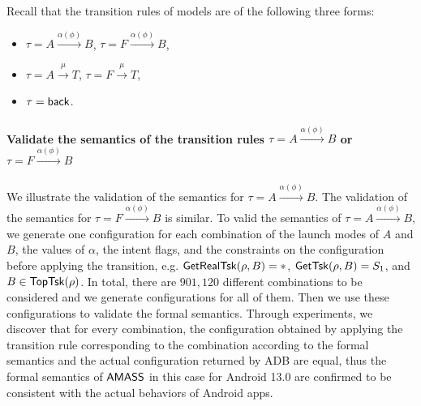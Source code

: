 Recall that the transition rules of {\AMASS} models are of the following three forms:
\begin{itemize}
	\item $\tau = A\xrightarrow{\alpha(\phi)}B$, $\tau = F\xrightarrow{\alpha(\phi)}B$,
	\item $\tau = A\xrightarrow{\mu}T$, $\tau = F\xrightarrow{\mu}T$,
	\item $\tau = {\mathsf{back} }$. 
\end{itemize}

\paragraph{Validate the semantics of the transition rules $\tau = A\xrightarrow{\alpha(\phi)}B$ or $\tau = F\xrightarrow{\alpha(\phi)}B$}
We illustrate the validation of the semantics for $\tau = A\xrightarrow{\alpha(\phi)}B$. The validation of the semantics for $\tau = F\xrightarrow{\alpha(\phi)}B$ is similar. To valid the semantics of $\tau = A\xrightarrow{\alpha(\phi)}B$, we generate one configuration for each combination of the launch modes of $A$ and $B$, the values of $\alpha$, the intent flags, and the constraints on the configuration before applying the transition, e.g. $\mathsf{GetRealTsk}(\rho, B) = *$, $\mathsf{GetTsk}(\rho, B) = S_1$, and $B\in\mathsf{TopTsk}(\rho)$. 
In total, there are  $901,120$  different combinations  %
to be considered and we generate configurations for all of them.
Then we use these configurations to validate the formal semantics. Through experiments, we discover that for every combination, the configuration obtained by applying the transition rule corresponding to the combination according to the formal semantics and the actual configuration returned by ADB are equal, thus the formal semantics of $\textsf{AMASS}$ in this case for Android 13.0 are confirmed to be consistent with the actual behaviors of Android apps.  

%
